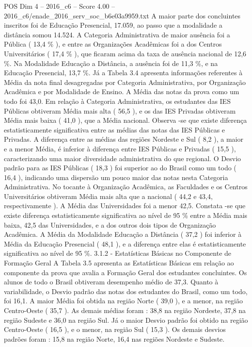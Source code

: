 \begin{textsample}{POS Dim 4 – 2016\_c6 – Score 4.00 – 2016\_c6/enade\_2016\_serv\_soc\_b6e03a9959.txt}
A maior parte dos concluintes inscritos foi de Educação Presencial, 17.059, ao passo que a modalidade a distância somou 14.524.
A Categoria Administrativa de maior ausência foi a Pública ( 13,4 \% ), e entre as Organizações Acadêmicas foi a dos Centros Universitários ( 17,4 \% ), que ficaram acima da taxa de ausência nacional de 12,6 \%.
Na Modalidade Educação a Distância, a ausência foi de 11,3 \%, e na Educação Presencial, 13,7 \%.
Já a Tabela 3.4 apresenta informações referentes à Média da nota final desagregadas por Categoria Administrativa, por Organização Acadêmica e por Modalidade de Ensino.
A Média das notas da prova como um todo foi 43,0.
Em relação à Categoria Administrativa, os estudantes das IES Públicas obtiveram Média mais alta ( 56,5 ), e os das IES Privadas obtiveram Média mais baixa ( 41,0 ), que a Média nacional.
Observa -se que existe diferença estatisticamente significativa entre as médias das notas das IES Públicas e Privadas.
A diferença entre as médias das regiões Nordeste e Sul ( 8,2 ), a maior e a menor Média, é inferior à diferença entre IES Públicas e Privadas ( 15,5 ), caracterizando uma maior diversidade administrativa do que regional.
O Desvio padrão para as IES Públicas ( 18,3 ) foi superior ao do Brasil como um todo ( 16,4 ), indicando uma dispersão um pouco maior das notas nesta Categoria Administrativa.
No tocante à Organização Acadêmica, as Faculdades e os Centros Universitários obtiveram Média mais alta que a nacional ( 44,2 e 43,4, respectivamente ).
A Média das Universidades foi a menor 42,5.
Constata -se que existe diferença estatisticamente significativa ao nível de 95 \% entre a Média mais baixa, 42,5 das Universidades, e a dos outros dois tipos de Organização Acadêmica.
A Média da Modalidade Educação a Distância ( 37,2 ) foi inferior à Média da Educação Presencial ( 48,1 ), e a diferença entre elas é estatisticamente significativa ao nível de 95 \%. 3.1.2 - Estatísticas Básicas no Componente de Formação Geral A Tabela 3.5 apresenta as Estatísticas Básicas em relação ao componente da prova que avalia a Formação Geral dos estudantes concluintes.
Os alunos de todo o Brasil obtiveram desempenho médio de 37,3.
Quanto à variabilidade, o Desvio padrão das notas dos estudantes do Brasil, como um todo, foi 16,1.
A maior Média foi obtida na região Norte ( 39,0 ), e a menor, na região Centro-Oeste ( 35,7 ).
As demais médias foram : 38,8 na região Nordeste, 37,8 na região Sudeste e 36,0 na região Sul.
Já o maior Desvio padrão foi obtido na região Centro-Oeste ( 16,5 ), e o menor, na região Sul ( 15,3 ).
Os demais desvios padrões foram : 15,8 na região Norte, 16,4 nas regiões Nordeste e Sudeste.

\end{textsample}
